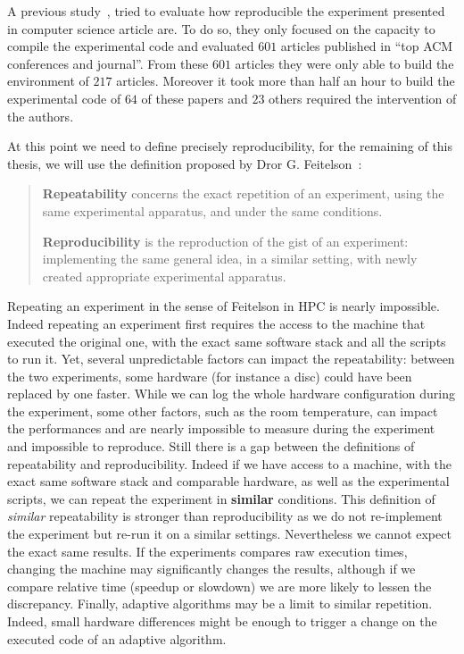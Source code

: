 A previous study~\cite{Collberg15Repeatability}, tried to evaluate how reproducible the experiment presented in computer science article are.
To do so, they only focused on the capacity to compile the experimental code and evaluated $601$ articles published in “top ACM conferences and journal”.
From these $601$ articles they were only able to build the environment of $217$ articles.
Moreover it took more than half an hour to build the experimental code of $64$ of these papers and $23$ others required the intervention of the authors.

At this point we need to define precisely reproducibility, for the remaining of this thesis, we will use the definition proposed by Dror G. Feitelson~\cite{Feitelson15From}:

\begin{quote}
    \textbf{Repeatability} concerns the exact repetition of an experiment, using the same experimental apparatus, and under the same conditions.

    \textbf{Reproducibility} is the reproduction of the gist of an experiment: implementing the same general idea, in a similar setting, with newly created appropriate experimental apparatus.
\end{quote}

Repeating an experiment in the sense of Feitelson in \gls{HPC} is nearly impossible.
Indeed repeating an experiment first requires the access to the machine that executed the original one, with the exact same software stack and all the scripts to run it.
Yet, several unpredictable factors can impact the repeatability: between the two experiments, some hardware (for instance a disc) could have been replaced by one faster.
While we can log the whole hardware configuration during the experiment, some other factors, such as the room temperature, can impact the performances and are nearly impossible to measure during the experiment and impossible to reproduce.
Still there is a gap between the definitions of repeatability and reproducibility.
Indeed if we have access to a machine, with the exact same software stack and comparable hardware, as well as the experimental scripts, we can repeat the experiment in \textbf{similar} conditions.
This definition of \emph{similar} repeatability is stronger than reproducibility as we do not re-implement the experiment but re-run it on a similar settings.
Nevertheless we cannot expect the exact same results.
If the experiments compares raw execution times, changing the machine may significantly changes the results, although if we compare relative time (speedup or slowdown) we are more likely to lessen the discrepancy.
Finally, adaptive algorithms may be a limit to similar repetition.
Indeed, small hardware differences might be enough to trigger a change on the executed code of an adaptive algorithm.

